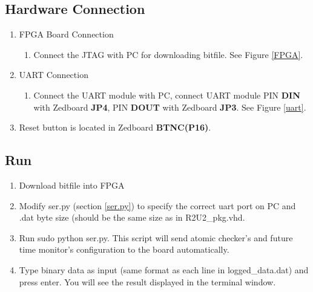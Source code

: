 \documentclass{article}
\theoremstyle{definition}
\begin{document}
\subsection{Hardware Connection}
\begin{enumerate}
	\item FPGA Board Connection
	\begin{enumerate}
		\item Connect the JTAG with PC for downloading bitfile. See Figure \ref{FPGA}.
	\end{enumerate}
	\item UART Connection
	\begin{enumerate}
		\item Connect the UART module with PC, connect UART module PIN \textbf{DIN} with Zedboard \textbf{JP4}, PIN \textbf{DOUT} with Zedboard \textbf{JP3}. See Figure \ref{uart}.
	\end{enumerate}
	\item Reset button is located in Zedboard  \textbf{BTNC(P16)}.
\end{enumerate}

\subsection{Run}
\begin{enumerate}
	\item Download bitfile into FPGA
	\item Modify \textcolor{green!100}{ser.py} (section \ref{ser.py}) to specify the correct uart port on PC and .dat byte size (should be the same size as in \textcolor{purple!30}{R2U2\_pkg.vhd}.
	\item Run  \colorbox{blue!30}{sudo python ser.py}. This script will send atomic checker's and future time monitor's configuration to the board automatically.
	\item Type binary data as input (same format as each line in \textcolor{purple!30}{logged\_data.dat}) and press enter. You will see the result displayed in the terminal window.
\end{enumerate}
\end{document}
